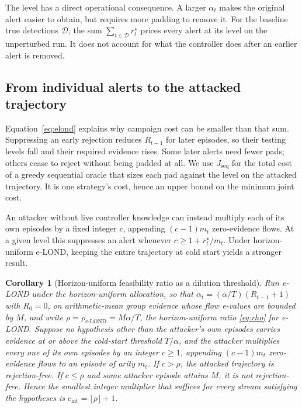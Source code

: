 \documentclass[conference]{IEEEtran}
\newtheorem{corollary}{Corollary}
\newcommand{\ceil}{M}
\newcommand{\alphat}{\alpha_t}
\begin{document}
The level has a direct operational consequence. A larger $\alphat$ makes the original alert easier
to obtain, but requires more padding to remove it. For the baseline true detections $\mathcal D$,
the sum $\sum_{t\in\mathcal D}r^\star_t$ prices every alert at its level on the unperturbed run.
It does not account for what the controller does after an earlier alert is removed.

\subsection{From individual alerts to the attacked trajectory}\label{sec:jointtheory}

Equation~\eqref{eq:elond} explains why campaign cost can be smaller than that sum. Suppressing an
early rejection reduces $R_{t-1}$ for later episodes, so their testing levels fall and their required
evidence rises. Some later alerts need fewer pads; others cease to reject without being padded at
all. We use $J_{\mathrm{seq}}$ for the total cost of a greedy sequential oracle that sizes each pad
against the level on the attacked trajectory. It is one strategy's cost, hence an upper bound on
the minimum joint cost.

An attacker without live controller knowledge can instead multiply each of its own episodes by a
fixed integer $c$, appending $(c-1)m_t$ zero-evidence flows. At a given level this suppresses an
alert whenever $c\ge1+r^\star_t/m_t$. Under horizon-uniform e-LOND, keeping the entire trajectory
at cold start yields a stronger result.

\begin{corollary}[Horizon-uniform feasibility ratio as a dilution threshold]\label{cor:dilution}
Run e-LOND under the horizon-uniform allocation, so that $\alphat=(\alpha/T)(R_{t-1}+1)$ with
$R_0=0$, on arithmetic-mean group evidence whose flow e-values are bounded by $\ceil$, and write
$\rho=\rho_{\text{e-LOND}}=\ceil\alpha/T$, the horizon-uniform ratio \eqref{eq:rho} for e-LOND. Suppose no hypothesis other than the attacker's own
episodes carries evidence at or above the cold-start threshold $T/\alpha$, and the attacker
multiplies every one of its own episodes by an integer $c\ge1$, appending $(c-1)m_t$ zero-evidence
flows to an episode of arity $m_t$. If $c>\rho$, the attacked trajectory is rejection-free. If
$c\le\rho$ and some attacker episode attains $\ceil$, it is not rejection-free. Hence the smallest integer
multiplier that suffices for every stream satisfying the hypotheses is
$c_{\mathrm{int}}=\lfloor\rho\rfloor+1$.
\end{corollary}
\end{document}
